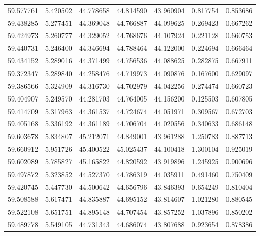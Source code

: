 \begin{tabular}{rrrrrrr}
 59.577761 &   5.420502 &         44.778658 &         44.814590 &         43.960904 &  0.817754 &  0.853686 \\
 59.438285 &   5.277451 &         44.369048 &         44.766887 &         44.099625 &  0.269423 &  0.667262 \\
 59.424973 &   5.260777 &         44.329052 &         44.768676 &         44.107924 &  0.221128 &  0.660753 \\
 59.440731 &   5.246400 &         44.346694 &         44.788464 &         44.122000 &  0.224694 &  0.666464 \\
 59.434152 &   5.289016 &         44.371499 &         44.756536 &         44.088625 &  0.282875 &  0.667911 \\
 59.372347 &   5.289840 &         44.258476 &         44.719973 &         44.090876 &  0.167600 &  0.629097 \\
 59.386566 &   5.324909 &         44.316730 &         44.702979 &         44.042256 &  0.274474 &  0.660723 \\
 59.404907 &   5.249570 &         44.281703 &         44.764005 &         44.156200 &  0.125503 &  0.607805 \\
 59.414709 &   5.317963 &         44.361537 &         44.724674 &         44.051971 &  0.309567 &  0.672703 \\
 59.405168 &   5.336192 &         44.361189 &         44.706704 &         44.020556 &  0.340633 &  0.686148 \\
 59.603678 &   5.834807 &         45.212071 &         44.849001 &         43.961288 &  1.250783 &  0.887713 \\
 59.660912 &   5.951726 &         45.400522 &         45.025437 &         44.100418 &  1.300104 &  0.925019 \\
 59.602089 &   5.785827 &         45.165822 &         44.820592 &         43.919896 &  1.245925 &  0.900696 \\
 59.497872 &   5.323852 &         44.527370 &         44.786319 &         44.035911 &  0.491460 &  0.750409 \\
 59.420745 &   5.447730 &         44.500642 &         44.656796 &         43.846393 &  0.654249 &  0.810404 \\
 59.508588 &   5.617471 &         44.835887 &         44.695152 &         43.814607 &  1.021280 &  0.880545 \\
 59.522108 &   5.651751 &         44.895148 &         44.707454 &         43.857252 &  1.037896 &  0.850202 \\
 59.489778 &   5.549105 &         44.731343 &         44.686074 &         43.807688 &  0.923654 &  0.878386 \\

\end{tabular}
